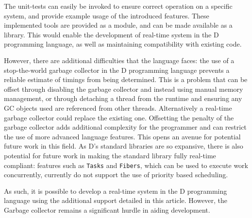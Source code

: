The unit-tests can easily be invoked to ensure correct operation on a specific
system, and provide example usage of the introduced features. 
These implemented tools are provided as a module, and can be made available as 
a library. This would enable the development of real-time system in the D programming 
language, as well as maintaining compatibility with existing code. 
\par\bigskip\noindent
However, there are additional difficulties that the 
language faces: the use of a stop-the-world garbage collector in the 
D programming language prevents a reliable estimate of timings from being determined. 
This is a problem that can be offset through disabling the garbage collector 
and instead using manual memory management, or through detaching a thread from the 
runtime and ensuring any GC objects used are referenced from other threads.
Alternatively a real-time garbage collector could replace the existing one. 
Offsetting the penalty of the garbage collector adds additional complexity for 
the programmer and can restrict the use of more advanced language features.
This opens an avenue for potential future work in this field. 
As D's standard libraries are so expansive, there is also potential for future
work in making the standard library fully real-time compliant: features such as
\texttt{Tasks} and \texttt{Fibers}, which can be used to execute work
concurrently, currently do not support the use of priority based scheduling. 
\par\bigskip\noindent
As such, it is possible to develop a real-time system in the D programming 
language using the additional support detailed in this article. However, 
the Garbage collector remains a significant hurdle in aiding development.
